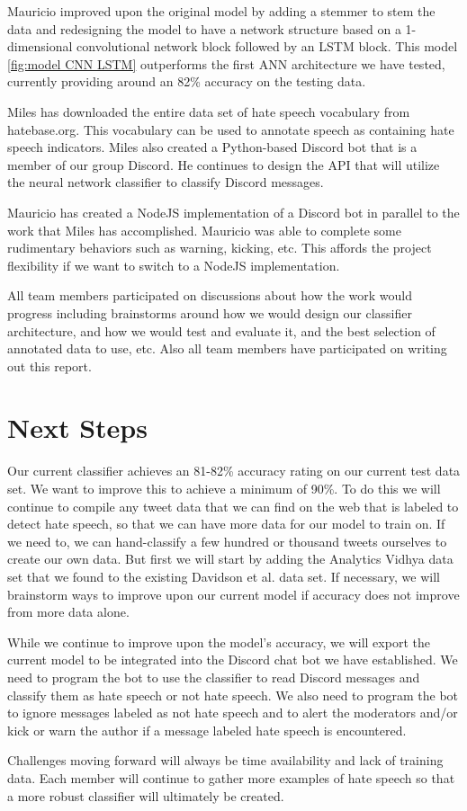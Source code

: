 \documentclass[conference]{sig-alternate-05-2015}
\begin{document}
Mauricio improved upon the original model by adding a stemmer to stem the data and redesigning the model to have a network structure based on a 1-dimensional convolutional network block followed by an LSTM block. This model \ref{fig:model CNN LSTM} outperforms the first ANN architecture we have tested, currently providing around an 82\% accuracy on the testing data.

Miles has downloaded the entire data set of hate speech vocabulary from hatebase.org.  This vocabulary can be used to annotate speech as containing hate speech indicators.  Miles also created a Python-based Discord bot that is a member of our group Discord. He continues to design the API that will utilize the neural network classifier to classify Discord messages.

Mauricio has created a NodeJS implementation of a Discord bot in parallel to the work that Miles has accomplished.  Mauricio was able to complete some rudimentary behaviors such as warning, kicking, etc.  This affords the project flexibility if we want to switch to a NodeJS implementation.

All team members participated on discussions about how the work would progress including brainstorms around how we would design our classifier architecture, and how we would test and evaluate it, and the best selection of annotated data to use, etc. Also all team members have participated on writing out this report. 


\section{Next Steps}

Our current classifier achieves an 81-82\% accuracy rating on our current test data set. We want to improve this to achieve a minimum of 90\%. To do this we will continue to compile any tweet data that we can find on the web that is labeled to detect hate speech, so that we can have more data for our model to train on. If we need to, we can hand-classify a few hundred or thousand tweets ourselves to create our own data. But first we will start by adding the Analytics Vidhya data set that we found to the existing Davidson et al. data set.
If necessary, we will brainstorm ways to improve upon our current model if accuracy does not improve from more data alone.

While we continue to improve upon the model's accuracy, we will export the current model to be integrated into the Discord chat bot we have established. We need to program the bot to use the classifier to read Discord messages and classify them as hate speech or not hate speech. We also need to program the bot to ignore messages labeled as not hate speech and to alert the moderators and/or kick or warn the author if a message labeled hate speech is encountered.

Challenges moving forward will always be time availability and lack of training data.  Each member will continue to gather more examples of hate speech so that a more robust classifier will ultimately be created.  



\end{document}
